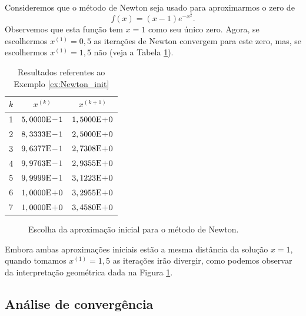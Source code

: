 \begin{ex}\label{ex:Newton_init}
  Consideremos que o método de Newton seja usado para aproximarmos o zero de
  \begin{equation}
    f(x) = (x-1)e^{-x^2}.
  \end{equation}
Observemos que esta função tem $x=1$ como seu único zero. Agora, se escolhermos $x^{(1)} = 0,5$ as iterações de Newton convergem para este zero, mas, se escolhermos $x^{(1)}=1,5$ não (veja a Tabela \ref{tab:ex_Newton_init}).

\begin{table}[h!]
  \centering
  \caption{Resultados referentes ao Exemplo \ref{ex:Newton_init}}
  \label{tab:ex_Newton_init}
  \begin{tabular}{r|cc}
    $k$ & $x^{(k)}$ & $x^{(k+1)}$ \\\hline
    1 & $5,0000\mathrm{E}\!-\!1$ & $1,5000\mathrm{E}\!+\!0$ \\
    2 & $8,3333\mathrm{E}\!-\!1$ & $2,5000\mathrm{E}\!+\!0$ \\
    3 & $9,6377\mathrm{E}\!-\!1$ & $2,7308\mathrm{E}\!+\!0$ \\
    4 & $9,9763\mathrm{E}\!-\!1$ & $2,9355\mathrm{E}\!+\!0$ \\
    5 & $9,9999\mathrm{E}\!-\!1$ & $3,1223\mathrm{E}\!+\!0$ \\
    6 & $1,0000\mathrm{E}\!+\!0$ & $3,2955\mathrm{E}\!+\!0$ \\
    7 & $1,0000\mathrm{E}\!+\!0$ & $3,4580\mathrm{E}\!+\!0$ \\\hline    
  \end{tabular}
\end{table}

  \begin{figure}[h!]
    \centering
    \caption{Escolha da aproximação inicial para o método de Newton.}
    \label{fig:ex_Newton_init}
  \end{figure}

Embora ambas aproximações iniciais estão a mesma distância da solução $x=1$, quando tomamos $x^{(1)}=1,5$ as iterações irão divergir, como podemos observar da interpretação geométrica dada na Figura \ref{fig:ex_Newton_init}.
\end{ex}

\subsection{Análise de convergência}

